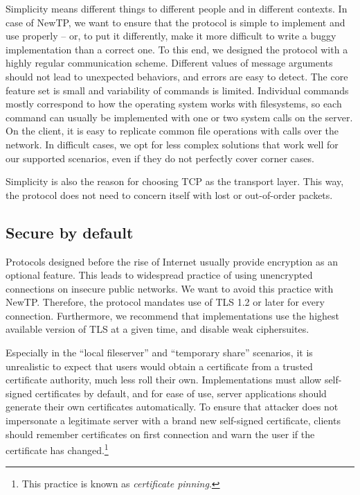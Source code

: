 Simplicity means different things to different people and in different contexts. In case of NewTP, we want to
ensure that the protocol is simple to implement and use properly -- or, to put it differently, make it more
difficult to write a buggy implementation than a correct one. To this end, we designed the protocol with
a highly regular communication scheme. Different values of message arguments should not lead to unexpected
behaviors, and errors are easy to detect.  The core feature set is small and variability of commands is
limited. Individual commands mostly correspond to how the operating system works with filesystems, so each
command can usually be implemented with one or two system calls on the server. On the client, it is easy to
replicate common file operations with calls over the network. In difficult cases, we opt for less complex
solutions that work well for our supported scenarios, even if they do not perfectly cover corner cases.

Simplicity is also the reason for choosing TCP as the transport layer. This way, the protocol does not need to
concern itself with lost or out-of-order packets.

%

\subsection{Secure by default}

Protocols designed before the rise of Internet usually provide encryption as an optional feature. This leads
to widespread practice of using unencrypted connections on insecure public networks. We want to avoid this
practice with NewTP. Therefore, the protocol mandates use of TLS 1.2 or later for every connection.
Furthermore, we recommend that implementations use the highest available version of TLS at a given time, and
disable weak ciphersuites.

Especially in the ``local fileserver'' and ``temporary share'' scenarios, it is unrealistic to expect that
users would obtain a certificate from a trusted certificate authority, much less roll their own.
Implementations must allow self-signed certificates by default, and for ease of use, server applications
should generate their own certificates automatically. To ensure that attacker does not impersonate
a legitimate server with a brand new self-signed certificate, clients should remember certificates on first
connection and warn the user if the certificate has changed.\footnote{This practice is known as {\it
certificate pinning}.}

